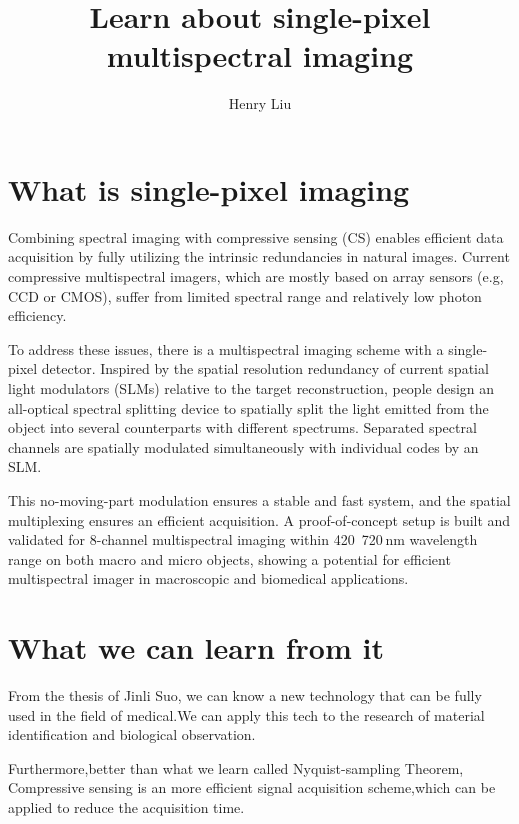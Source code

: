 \documentclass{article}
\author{Henry Liu}
\title{Learn about single-pixel multispectral imaging}
\begin{document}
  \maketitle
  \section{What is single-pixel imaging}
  \par 
  Combining spectral imaging with compressive sensing (CS) enables efficient data acquisition by fully utilizing the intrinsic redundancies in natural images. Current compressive multispectral imagers, which are mostly based on array sensors (e.g, CCD or CMOS), suffer from limited spectral range and relatively low photon efficiency. 
  
  To address these issues, there is a multispectral imaging scheme with a single-pixel detector. Inspired by the spatial resolution redundancy of current spatial light modulators (SLMs) relative to the target reconstruction, people design an all-optical spectral splitting device to spatially split the light emitted from the object into several counterparts with different spectrums. Separated spectral channels are spatially modulated simultaneously with individual codes by an SLM. 
  
  This no-moving-part modulation ensures a stable and fast system, and the spatial multiplexing ensures an efficient acquisition. A proof-of-concept setup is built and validated for 8-channel multispectral imaging within 420~720 nm wavelength range on both macro and micro objects, showing a potential for efficient multispectral imager in macroscopic and biomedical applications.
  \section{What we can learn from it}
  \par
  From the thesis of Jinli Suo, we can know a new technology that can be fully used in the field of medical.We can apply this tech to the research of material identification and biological observation.
  
  Furthermore,better than what we learn called Nyquist-sampling Theorem, Compressive sensing is an more efficient signal acquisition scheme,which can be applied to reduce the acquisition time.
\end{document}
